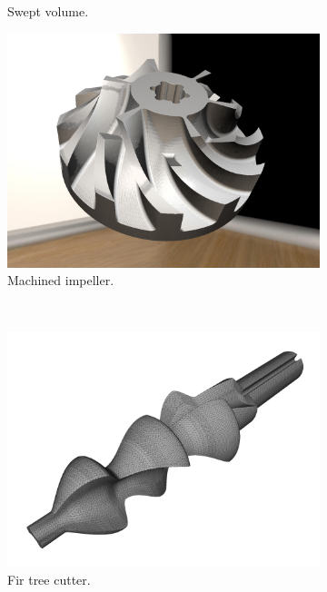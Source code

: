 \begin{figure}[h]
\begin{subfigure}[t]{0.32\textwidth}
			\caption{Swept volume.}
			\label{fig:hq_impeller_swept}
		\end{subfigure}
		\begin{subfigure}[t]{0.32\textwidth}
			\centering
			\includegraphics[width=\textwidth]{images/hq_impeller_complete}
			\caption{Machined impeller.}
			\label{fig:hq_impeller_complete}
		\end{subfigure}
		\\
		\begin{subfigure}[t]{0.32\textwidth}
			\centering
			\includegraphics[width=\textwidth]{images/turbine_tool}
			\caption{Fir tree cutter.}
			\label{fig:turbine_tool}
		\end{subfigure}
		\begin{subfigure}[t]{0.32\textwidth}

\end{subfigure}
\end{figure}
